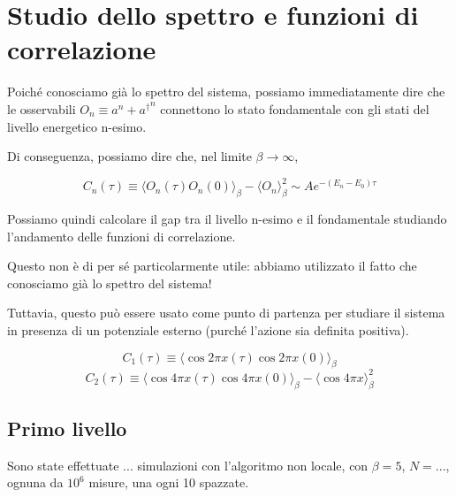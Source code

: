 \documentclass[a4paper,11pt]{article}
\newcommand{\avg}[1]{\langle {#1} \rangle}
\begin{document}
    \section{Studio dello spettro e funzioni di correlazione}
    
    Poiché conosciamo già lo spettro del sistema, possiamo immediatamente dire che le osservabili $O_n \equiv a^n + {a^\dagger}^n$ connettono lo stato fondamentale con gli stati del livello energetico n-esimo.
    
    Di conseguenza, possiamo dire che, nel limite $\beta \to \infty$, 
    
    \begin{equation}
        C_n (\tau) \equiv \avg{ O_n(\tau)O_n(0) }_\beta - \avg{O_n}^2_\beta \sim A e^{-(E_n - E_0) \tau}
    \end{equation}
    
    Possiamo quindi calcolare il gap tra il livello n-esimo e il fondamentale studiando l'andamento delle funzioni di correlazione. 
    
    Questo non è di per sé particolarmente utile: abbiamo utilizzato il fatto che conosciamo già lo spettro del sistema! 
    
    Tuttavia, questo può essere usato come punto di partenza per studiare il sistema in presenza di un potenziale esterno (purché l'azione sia definita positiva). 

    
    \begin{equation}
         C_1 (\tau) \equiv \avg{\cos 2\pi x(\tau) \cos 2\pi x(0)}_\beta 
    \end{equation}
    \begin{equation}
        C_2 (\tau) \equiv \avg{\cos 4\pi x(\tau) \cos 4\pi x(0)}_\beta - \avg{\cos 4\pi x}^2_\beta
    \end{equation}
    
    \subsection{Primo livello}

    Sono state effettuate ... simulazioni con l'algoritmo non locale, con $\beta = 5$, $N = ...$, ognuna da $10^6$ misure, una ogni 10 spazzate.

    

    
\end{document}
